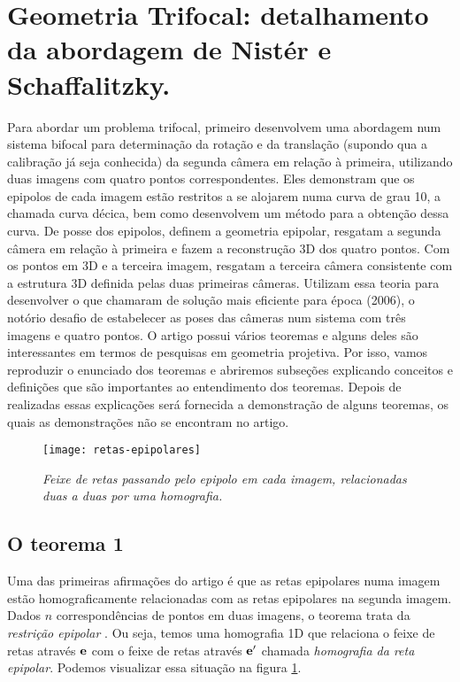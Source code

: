 \section{Geometria Trifocal: detalhamento da abordagem de Nistér e Schaffalitzky.}\label{sec.nister}

Para abordar um problema trifocal, primeiro \cite{2503343} desenvolvem uma abordagem num sistema bifocal para determinação da rotação e da translação (supondo qua a calibração já seja conhecida) da segunda câmera em relação à primeira, utilizando duas imagens com quatro pontos correspondentes. Eles demonstram que os epipolos de cada imagem estão restritos a se alojarem numa curva de grau 10, a chamada curva décica, bem como desenvolvem um método para a obtenção dessa curva. De posse dos epipolos, definem a geometria epipolar, resgatam a segunda câmera em relação à primeira e fazem a reconstrução 3D dos quatro pontos. Com os pontos em 3D e a terceira imagem, resgatam a terceira câmera consistente com a estrutura 3D definida pelas duas primeiras câmeras. Utilizam essa teoria para desenvolver o que chamaram de solução mais eficiente para época (2006), o notório desafio de estabelecer as poses das câmeras num sistema com três imagens e quatro pontos. O artigo possui vários teoremas e alguns deles são interessantes em termos de pesquisas em geometria projetiva. Por isso, vamos reproduzir o enunciado dos teoremas e abriremos subseções explicando conceitos e definições que são importantes ao entendimento dos teoremas. Depois de realizadas essas explicações será fornecida a demonstração de alguns teoremas, os quais as demonstrações não se encontram no artigo.

\begin{figure}[!htb]
\centering
\texttt{[image: retas-epipolares]}
\caption{\textit{Feixe de retas passando pelo epipolo em cada imagem, relacionadas duas a duas por uma homografia.}}
\label{retas-epipolares}
\end{figure}

\subsection{O teorema 1}\label{sec.homografia-reta-epipolar} 


Uma das primeiras afirmações do artigo é que as retas epipolares numa  imagem estão homograficamente relacionadas com as retas epipolares na segunda imagem. Dados $n$ correspondências de pontos em duas imagens, o teorema trata da \textit{restrição epipolar} \citep{faugeras93three}. Ou seja, temos uma homografia 1D que relaciona o feixe de retas através ${\bf e}$ com o feixe de retas através ${\bf e'}$ chamada \textit{homografia da reta epipolar}. Podemos visualizar essa situação na figura \ref{retas-epipolares}.

